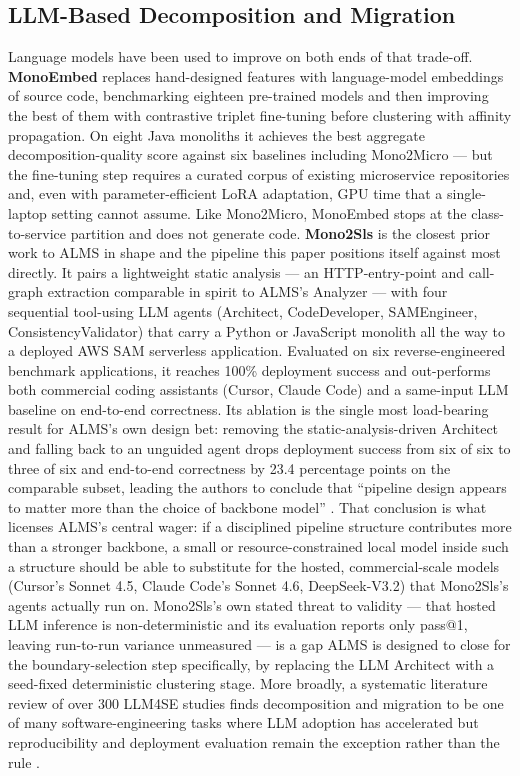 \documentclass[conference]{IEEEtran}
\begin{document}
\subsection{LLM-Based Decomposition and Migration}

Language models have been used to improve on both ends of that trade-off. \textbf{MonoEmbed} \cite{sellami2025} replaces hand-designed features with language-model embeddings of source code, benchmarking eighteen pre-trained models and then improving the best of them with contrastive triplet fine-tuning before clustering with affinity propagation. On eight Java monoliths it achieves the best aggregate decomposition-quality score against six baselines including Mono2Micro --- but the fine-tuning step requires a curated corpus of existing microservice repositories and, even with parameter-efficient LoRA adaptation, GPU time that a single-laptop setting cannot assume. Like Mono2Micro, MonoEmbed stops at the class-to-service partition and does not generate code. \textbf{Mono2Sls} \cite{chen2026} is the closest prior work to ALMS in shape and the pipeline this paper positions itself against most directly. It pairs a lightweight static analysis --- an HTTP-entry-point and call-graph extraction comparable in spirit to ALMS's Analyzer --- with four sequential tool-using LLM agents (Architect, CodeDeveloper, SAMEngineer, ConsistencyValidator) that carry a Python or JavaScript monolith all the way to a deployed AWS SAM serverless application. Evaluated on six reverse-engineered benchmark applications, it reaches 100\% deployment success and out-performs both commercial coding assistants (Cursor, Claude Code) and a same-input LLM baseline on end-to-end correctness. Its ablation is the single most load-bearing result for ALMS's own design bet: removing the static-analysis-driven Architect and falling back to an unguided agent drops deployment success from six of six to three of six and end-to-end correctness by 23.4 percentage points on the comparable subset, leading the authors to conclude that ``pipeline design appears to matter more than the choice of backbone model'' \cite{chen2026}. That conclusion is what licenses ALMS's central wager: if a disciplined pipeline structure contributes more than a stronger backbone, a small or resource-constrained local model inside such a structure should be able to substitute for the hosted, commercial-scale models (Cursor's Sonnet 4.5, Claude Code's Sonnet 4.6, DeepSeek-V3.2) that Mono2Sls's agents actually run on. Mono2Sls's own stated threat to validity --- that hosted LLM inference is non-deterministic and its evaluation reports only pass@1, leaving run-to-run variance unmeasured \cite{chen2026} --- is a gap ALMS is designed to close for the boundary-selection step specifically, by replacing the LLM Architect with a seed-fixed deterministic clustering stage. More broadly, a systematic literature review of over 300 LLM4SE studies finds decomposition and migration to be one of many software-engineering tasks where LLM adoption has accelerated but reproducibility and deployment evaluation remain the exception rather than the rule \cite{hou2024}.
\end{document}
